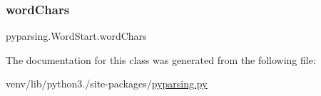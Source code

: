 \mbox{\label{classpyparsing_1_1WordStart_a0ea923f197bd62b93541fae61a15df4b}} 
\subsubsection{\texorpdfstring{word\+Chars}{wordChars}}
{\footnotesize\ttfamily pyparsing.\+Word\+Start.\+word\+Chars}



The documentation for this class was generated from the following file\+:\begin{DoxyCompactItemize}
\item 
venv/lib/python3./site-\/packages/\hyperlink{pyparsing_8py}{pyparsing.\+py}\end{DoxyCompactItemize}
